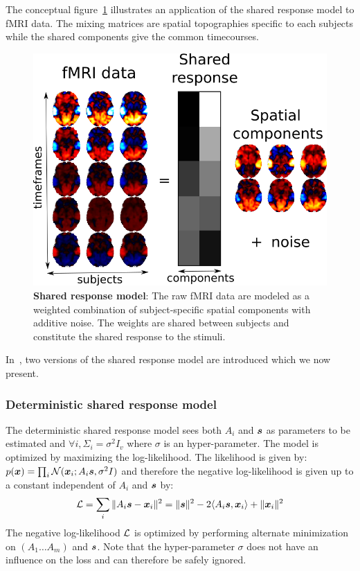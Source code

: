 The conceptual figure~\ref{fig:srm:conceptual_figure} illustrates an 
application of the shared response model to fMRI data. The mixing
matrices are spatial topographies specific to each subjects while the shared
components give the common timecourses.

\begin{figure}
  \centering
  \includegraphics[scale=0.3]{figures/srm/conceptual_figure31.png}
  \caption{\textbf{Shared response model}: The raw fMRI data are modeled as a weighted combination of subject-specific spatial components with additive noise. The weights are shared between subjects and constitute the shared response to the stimuli.}
  \label{fig:srm:conceptual_figure}
\end{figure}

In~\cite{chen2015reduced, anderson2016enabling}, two versions of the shared response model are
introduced which we now present.
\subsubsection{Deterministic shared response model}
\label{sec:deterministicsrm}
The deterministic shared response model sees both $A_i$ and $\boldsymbol{s}$ as parameters to be
estimated and $\forall i, \Sigma_i=\sigma^2 I_v$ where $\sigma$ is an hyper-parameter.
The model is optimized by maximizing the log-likelihood.
The likelihood is given by: $p(\boldsymbol{x}) = \prod_i \mathcal{N}(\boldsymbol{x}_i; A_i \boldsymbol{s}, \sigma^2 I)$ and
therefore the negative log-likelihood is given up to a constant independent of
$A_i$ and $\boldsymbol{s}$ by:
\begin{align}
  \mathcal{L} = \sum_i \|A_i \boldsymbol{s} - \boldsymbol{x}_i \|^2 = \| \boldsymbol{s} \|^2 -2 \langle A_i \boldsymbol{s}, \boldsymbol{x}_i \rangle + \| \boldsymbol{x}_i \|^2
  \label{eq:detsrmloss}
\end{align}
The negative log-likelihood $\mathcal{L}$ is optimized by performing alternate minimization on $(A_1 \dots A_m)$
and $\boldsymbol{s}$. Note that the hyper-parameter $\sigma$ does not have an influence on
the loss and can therefore be safely ignored.

